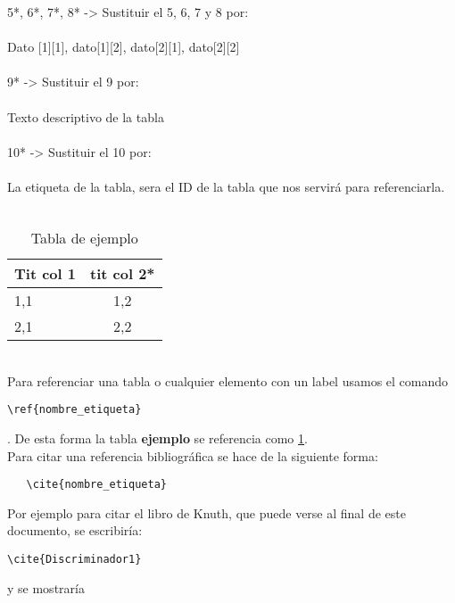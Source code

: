 5*, 6*, 7*, 8* -> Sustituir el 5, 6, 7 y 8 por:\\
\\
Dato [1][1], dato[1][2], dato[2][1], dato[2][2]\\
\\
9* -> Sustituir el 9 por:\\
\\
Texto descriptivo de la tabla\\
\\
10* -> Sustituir el 10 por:\\
\\
La etiqueta de la tabla, sera el ID de la tabla que nos servirá para referenciarla.\\
\\
\begin{table}[!h]
  \centering
  \begin{tabular}{lc}
\hline \hline
Tit col 1 & tit col 2*\\
\hline
1,1 & 1,2\\
2,1 & 2,2\\
\hline \hline
  \end{tabular}
  \caption{Tabla de ejemplo}
  \label{TabEjem}
\end{table}\\
Para referenciar una tabla o cualquier elemento con un label usamos el comando \begin{verbatim}\ref{nombre_etiqueta}\end{verbatim}. De esta forma la tabla \textbf{ejemplo }se referencia como \ref{TabEjem}.\\

Para citar una referencia bibliográfica se hace de la siguiente forma: \begin{verbatim}   \cite{nombre_etiqueta}\end{verbatim} Por ejemplo para citar el libro de Knuth, que puede verse al final de este documento, se escribiría: \begin{verbatim}\cite{Discriminador1}\end{verbatim} y se mostraría \cite{Discriminador1}

















